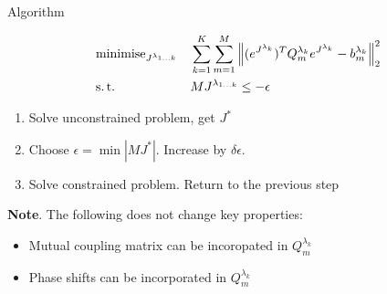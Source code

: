 \documentclass[../main.tex]{subfiles}
\begin{document}
\begin{frame}[t]{Algorithm}

\begin{equation*}
\begin{aligned}
& \operatorname{minimise}_{J^{\lambda_{1\ldots k}}} 
& & \sum_{k=1}^K \sum_{m=1}^M \Big\| (e^{J^{\lambda_{k}}})^T Q^{\lambda_{k}}_m  e^{J^{\lambda_{k}}} - b^{\lambda_{k}}_m \Big\|_2^2 \\
& \operatorname{s.t.}
& & M J^{\lambda_{1 \ldots k}} \le - \epsilon
\end{aligned}
\label{general_problem_formulation3}
\end{equation*}

\begin{enumerate}
    \item Solve unconstrained problem, get $J^*$
    \item Choose $\epsilon = \min{|MJ^*|}$. Increase by $\delta \epsilon$.
    \item Solve constrained problem. Return to the previous step
\end{enumerate}

\vspace{0.3cm}

\textbf{Note}. The following does not change key properties:
\begin{itemize}
    \item Mutual coupling matrix can be incoropated in $Q^{\lambda_{k}}_m$
    \item Phase shifts can be incorporated in $Q^{\lambda_{k}}_m$
\end{itemize}

\end{frame}
\end{document}

